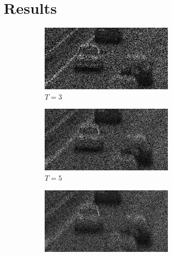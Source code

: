 \documentclass[a4paper, landscape]{article}
\begin{document}
\section*{Results}
\begin{figure}[H]
	\centering
	\begin{subfigure}{0.2\linewidth}
		\centering
		\includegraphics[width=\linewidth]{cars/coded snapshot, T = 3.png}
		\caption{$T=3$}
	\end{subfigure}
	\begin{subfigure}{0.2\linewidth}
		\centering
		\includegraphics[width=\linewidth]{cars/coded snapshot, T = 5.png}
		\caption{$T=5$}
	\end{subfigure}
	\begin{subfigure}{0.2\linewidth}
		\centering
		\includegraphics[width=\linewidth]{cars/coded snapshot, T = 7.png}

\end{subfigure}
\end{figure}
\end{document}
